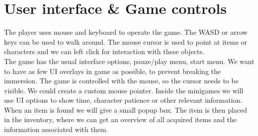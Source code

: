 \documentclass{article}
\begin{document}
\section{User interface \& Game controls}
	The player uses mouse and keyboard to operate the game. The WASD or arrow keys can be used to walk around. The mouse cursor is used to point at items or characters and we can left click for interaction with these objects.\\
	The game has the usual interface options, pauze/play menu, start menu. We want to have as few UI overlays in game as possible, to prevent breaking the immersion. The game is controlled with the mouse, so the cursor needs to be visible. We could create a custom mouse pointer. Inside the minigames we will use UI options to show time, character patience or other relevant information. When an item is found we will give a small popup box. The item is then placed in the inventory, where we can get an overview of all acquired items and the information associated with them.
\end{document}
